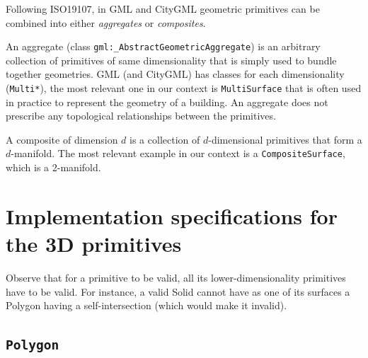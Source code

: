 %

Following ISO19107, in GML and CityGML geometric primitives can be combined into either \emph{aggregates} or \emph{composites}.

An aggregate (class \texttt{gml:\_AbstractGeometricAggregate}) is an arbitrary collection of primitives of same dimensionality that is simply used to bundle together geometries.
GML (and CityGML) has classes for each dimensionality (\texttt{Multi*}), the most relevant one in our context is \texttt{MultiSurface} that is often used in practice to represent the geometry of a building.
An aggregate does not prescribe any topological relationships between the primitives.

A composite of dimension $d$ is a collection of $d$-dimensional primitives that form a $d$-manifold. 
The most relevant example in our context is a \texttt{CompositeSurface}, which is a 2-manifold.



%
\section[Implementation specifications]{Implementation specifications for the 3D primitives}%
\label{sec:isovalidity}


Observe that for a primitive to be valid, all its lower-dimensionality primitives have to be valid.
For instance, a valid Solid cannot have as one of its surfaces a Polygon having a self-intersection (which would make it invalid).


\subsection{\texttt{Polygon}}

